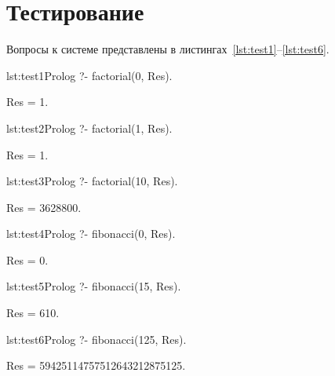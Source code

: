 \section{Тестирование}
Вопросы к системе представлены в листингах~\ref{lst:test1}--\ref{lst:test6}.

\begin{listing}[Факториал 0]{lst:test1}{Prolog}
?- factorial(0, Res).

Res = 1.
\end{listing}

\begin{listing}[Факториал 1]{lst:test2}{Prolog}
?- factorial(1, Res).

Res = 1.
\end{listing}

\begin{listing}[Факториал 10]{lst:test3}{Prolog}
?- factorial(10, Res).

Res = 3628800.
\end{listing}

\begin{listing}{lst:test4}{Prolog}
?- fibonacci(0, Res).

Res = 0.
\end{listing}

\begin{listing}{lst:test5}{Prolog}
?- fibonacci(15, Res).

Res = 610.
\end{listing}

\begin{listing}{lst:test6}{Prolog}
?- fibonacci(125, Res).

Res = 59425114757512643212875125.
\end{listing}
